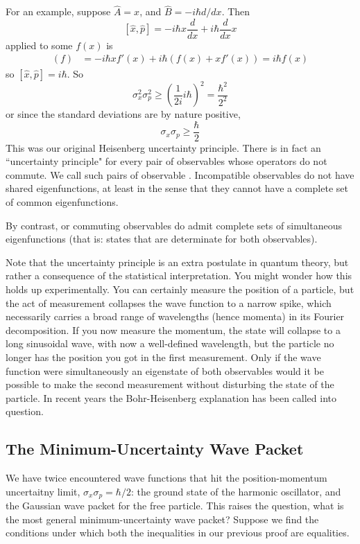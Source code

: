 \documentclass[12pt, a4paper, oneside, openright, titlepage]{book}
\begin{document}
For an example, suppose $\hat{A} = x$, and $\hat{B} = -i\hbar d/dx$. Then $$[\hat{x},\hat{p}] = -i\hbar x \frac{d}{dx} + i\hbar \frac{d}{dx}x$$ applied to some $f(x)$ is \begin{align*}
    [\hat{x},\hat{p}](f) &= -i\hbar xf'(x) + i\hbar(f(x) + xf'(x)) = i\hbar f(x)
\end{align*}
so $[\hat{x},\hat{p}] = i\hbar$. So $$\sigma_x^2\sigma_p^2 \geq \left(\frac{1}{2i}i\hbar\right)^2 = \frac{\hbar^2}{2^2}$$
or since the standard deviations are by nature positive, $$\sigma_x\sigma_p \geq \frac{\hbar}{2}$$
This was our original Heisenberg uncertainty principle. There is in fact an ``uncertainty principle" for every pair of observables whose operators do not commute. We call such pairs of observable . Incompatible observables do not have shared eigenfunctions, at least in the sense that they cannot have a complete set of common eigenfunctions.

By contrast,  or commuting observables do admit complete sets of simultaneous eigenfunctions (that is: states that are determinate for both observables).

Note that the uncertainty principle is  an extra postulate in quantum theory, but rather a consequence of the statistical interpretation. You might wonder how this holds up experimentally. You can certainly measure the position of a particle, but the act of measurement collapses the wave function to a narrow spike, which necessarily carries a broad range of wavelengths (hence momenta) in its Fourier decomposition. If you now measure the momentum, the state will collapse to a long sinusoidal wave, with now a well-defined wavelength, but the particle no longer has the position you got in the first measurement. Only if the wave function were simultaneously an eigenstate of both observables would it be possible to make the second measurement without disturbing the state of the particle. In recent years the Bohr-Heisenberg explanation has been called into question.

\subsection{The Minimum-Uncertainty Wave Packet}

We have twice encountered wave functions that hit the position-momentum uncertaitny limit, $\sigma_x\sigma_p = \hbar/2$: the ground state of the harmonic oscillator, and the Gaussian wave packet for the free particle. This raises the question, what is the most general minimum-uncertainty wave packet? Suppose we find the conditions under which both the inequalities in our previous proof are equalities.
\end{document}
